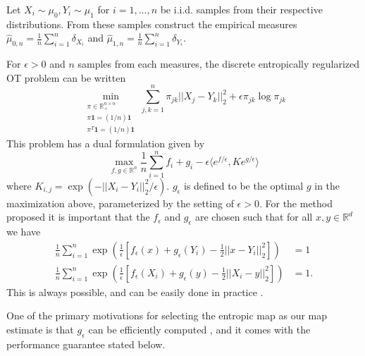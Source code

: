 \documentclass[nohyperref]{article}
\theoremstyle{definition}
\begin{document}
Let $X_i \sim \mu_0, Y_i \sim \mu_1$ for $i=1,...,n$ be i.i.d. samples from their respective distributions. From these samples construct the empirical measures $\hat{\mu}_{0,n} = \frac{1}{n}\sum_{i=1}^n \delta_{X_i}$ and $\hat{\mu}_{1,n} = \frac{1}{n}\sum_{i=1}^n \delta_{Y_i}$.

For $\epsilon > 0$ and $n$ samples from each measures, the discrete entropically regularized OT problem can be written
$$\min_{\substack{\pi \in \mathbb{R}^{n \times n}_+ \\
        \pi\bm{1} = (1/n)\bm{1} \\
        \pi^T\bm{1} = (1/n)\bm{1}}} \sum_{j,k=1}^{n} \pi_{jk}||X_j - Y_k||_2^2 + \epsilon \pi_{jk}\log \pi_{jk}$$
This problem has a dual formulation \cite{genevay2019entropy} given by
$$
\max_{f,g \in \mathbb{R}^n} \frac{1}{n} \sum_{i=1}^n f_i+g_i - \epsilon\langle e^{f/\epsilon}, Ke^{g/\epsilon}\rangle
$$
where $K_{i,j} = \exp(-||X_i - Y_i||_2^2/\epsilon)$. $g_\epsilon$ is defined to be the optimal $g$ in the maximization above, parameterized by the setting of $\epsilon > 0.$  For the method proposed it is important that the $f_\epsilon$ and $g_\epsilon$ are chosen such that for all $x,y \in \mathbb{R}^d$ we have
\begin{align*}
    \frac{1}{n}\sum_{i=1}^n \exp\left(\frac{1}{\epsilon} \left [ f_\epsilon(x) + g_\epsilon(Y_i) - \frac{1}{2}||x-Y_i||_2^2 \right ]\right) &= 1 \\
    \frac{1}{n}\sum_{i=1}^n  \exp\left(\frac{1}{\epsilon} \left [ f_\epsilon(X_i) + g_\epsilon(y) - \frac{1}{2}||X_i-y||_2^2 \right ]\right) &= 1.
\end{align*}
This is always possible, and can be easily done in practice \cite{pooladian2021entropic}.

One of the primary motivations for selecting the entropic map as our map estimate is that $g_\epsilon$ can be efficiently computed \cite{peyre2020computational}, and it comes with the performance guarantee stated below.
\end{document}

